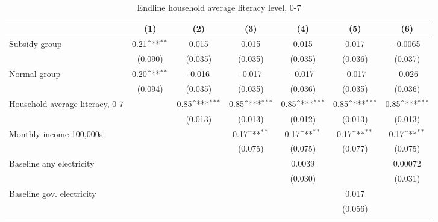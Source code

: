 \begin{table}[htbp]\centering
\def\sym#1{\ifmmode^{#1}\else\(^{#1}\)\fi}
\caption{Endline household average literacy level, 0-7}
\begin{tabular*}{1\hsize}{@{\hskip\tabcolsep\extracolsep\fill}l*{6}{c}}
\toprule
                &\multicolumn{1}{c}{(1)}         &\multicolumn{1}{c}{(2)}         &\multicolumn{1}{c}{(3)}         &\multicolumn{1}{c}{(4)}         &\multicolumn{1}{c}{(5)}         &\multicolumn{1}{c}{(6)}         \\
\midrule
Subsidy group   &     0.21\sym{**} &    0.015         &    0.015         &    0.015         &    0.017         &  -0.0065         \\
                &  (0.090)         &  (0.035)         &  (0.035)         &  (0.035)         &  (0.036)         &  (0.037)         \\
Normal group    &     0.20\sym{**} &   -0.016         &   -0.017         &   -0.017         &   -0.017         &   -0.026         \\
                &  (0.094)         &  (0.035)         &  (0.035)         &  (0.036)         &  (0.035)         &  (0.036)         \\
Household average literacy, 0-7&                  &     0.85\sym{***}&     0.85\sym{***}&     0.85\sym{***}&     0.85\sym{***}&     0.85\sym{***}\\
                &                  &  (0.013)         &  (0.013)         &  (0.012)         &  (0.013)         &  (0.013)         \\
Monthly income 100,000s&                  &                  &     0.17\sym{**} &     0.17\sym{**} &     0.17\sym{**} &     0.17\sym{**} \\
                &                  &                  &  (0.075)         &  (0.075)         &  (0.077)         &  (0.075)         \\
Baseline any electricity&                  &                  &                  &   0.0039         &                  &  0.00072         \\
                &                  &                  &                  &  (0.030)         &                  &  (0.031)         \\
Baseline gov. electricity&                  &                  &                  &                  &    0.017         &                  \\
                &                  &                  &                  &                  &  (0.056)         &                  \\

\end{tabular*}
\end{table}

